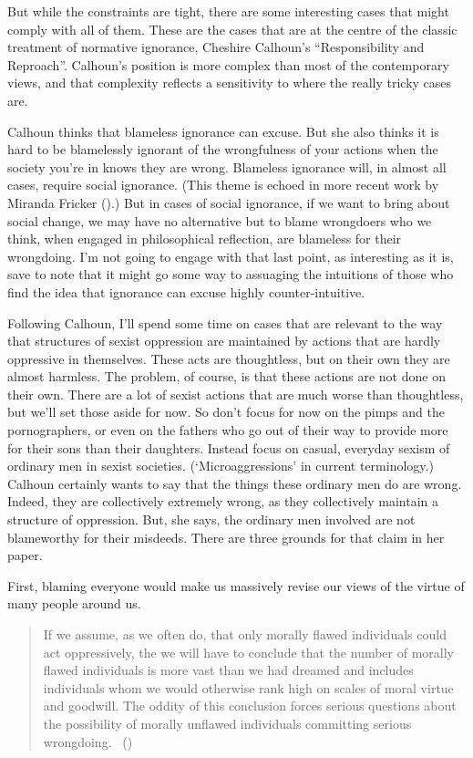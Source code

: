 \documentclass[
  10pt,
  letterpaper,
  twoside]{scrbook}
\begin{document}
But while the constraints are tight, there are some interesting cases
that might comply with all of them. These are the cases that are at the
centre of the classic treatment of normative ignorance, Cheshire
Calhoun's ``Responsibility and Reproach''. Calhoun's position is more
complex than most of the contemporary views, and that complexity
reflects a sensitivity to where the really tricky cases are.

Calhoun thinks that blameless ignorance can excuse. But she also thinks
it is hard to be blamelessly ignorant of the wrongfulness of your
actions when the society you're in knows they are wrong. Blameless
ignorance will, in almost all cases, require social ignorance. (This
theme is echoed in more recent work by Miranda Fricker
().) But in cases of social ignorance,
if we want to bring about social change, we may have no alternative but
to blame wrongdoers who we think, when engaged in philosophical
reflection, are blameless for their wrongdoing. I'm not going to engage
with that last point, as interesting as it is, save to note that it
might go some way to assuaging the intuitions of those who find the idea
that ignorance can excuse highly counter-intuitive.

Following Calhoun, I'll spend some time on cases that are relevant to
the way that structures of sexist oppression are maintained by actions
that are hardly oppressive in themselves. These acts are thoughtless,
but on their own they are almost harmless. The problem, of course, is
that these actions are not done on their own. There are a lot of sexist
actions that are much worse than thoughtless, but we'll set those aside
for now. So don't focus for now on the pimps and the pornographers, or
even on the fathers who go out of their way to provide more for their
sons than their daughters. Instead focus on casual, everyday sexism of
ordinary men in sexist societies. (`Microaggressions' in current
terminology.) Calhoun certainly wants to say that the things these
ordinary men do are wrong. Indeed, they are collectively extremely
wrong, as they collectively maintain a structure of oppression. But, she
says, the ordinary men involved are not blameworthy for their misdeeds.
There are three grounds for that claim in her paper.

First, blaming everyone would make us massively revise our views of the
virtue of many people around us.

\begin{quote}
If we assume, as we often do, that only morally flawed individuals could
act oppressively, the we will have to conclude that the number of
morally flawed individuals is more vast than we had dreamed and includes
individuals whom we would otherwise rank high on scales of moral virtue
and goodwill. The oddity of this conclusion forces serious questions
about the possibility of morally unflawed individuals committing serious
wrongdoing. ~()
\end{quote}
\end{document}
